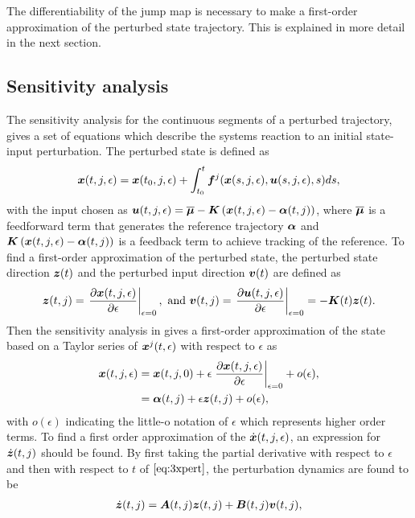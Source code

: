 \documentclass[../DC2017114Bouma.tex]{subfiles}
\begin{document}
The differentiability of the jump map is necessary to make a first-order approximation of the perturbed state trajectory. This is explained in more detail in the next section.

\subsection{Sensitivity analysis}
The sensitivity analysis for the continuous segments of a perturbed trajectory, gives a set of equations which describe the systems reaction to an initial state-input perturbation. The perturbed state is defined as
\begin{align}
{\boldsymbol{x}}(t,j,\epsilon) = {\boldsymbol{x}}(t_0,j,\epsilon) + \int_{t_0}^{t}{\boldsymbol{f}}^j({\boldsymbol{x}}(s,j,\epsilon),{\boldsymbol{u}}(s,j,\epsilon),s)ds,\label{eq:3xpert}
\end{align}
with the input chosen as ${\boldsymbol{u}}(t,j,\epsilon) = \overline{\boldsymbol{\mu}} - {\boldsymbol{K}}\left({\boldsymbol{x}}(t,j,\epsilon)-\boldsymbol{\alpha}(t,j)\right)$, where $\overline{\boldsymbol{\mu}}$ is a feedforward term that generates the reference trajectory $\boldsymbol{\alpha}$ and ${\boldsymbol{K}}\left({\boldsymbol{x}}(t,j,\epsilon)-\boldsymbol{\alpha}(t,j)\right)$ is a feedback term to achieve tracking of the reference. To find a first-order approximation of the perturbed state, the perturbed state direction ${\boldsymbol{z}}(t)$ and the perturbed input direction ${\boldsymbol{v}}(t)$ are defined as
\begin{align}
{\boldsymbol{z}}(t,j) = \left.\frac{\partial{\boldsymbol{x}}(t,j,\epsilon)}{\partial\epsilon}\right|_{\epsilon=0},\text{ and } {\boldsymbol{v}}(t,j) = \left.\frac{\partial{\boldsymbol{u}}(t,j,\epsilon)}{\partial\epsilon}\right|_{\epsilon=0}=-{\boldsymbol{K}}(t){\boldsymbol{z}}(t).
\end{align}
Then the sensitivity analysis in \cite{Khalil1996} gives a first-order approximation of the state based on a Taylor series of ${\boldsymbol{x}}^j(t,\epsilon)$ with respect to $\epsilon$ as
\begin{align}
{\boldsymbol{x}}(t,j,\epsilon) &= {\boldsymbol{x}}(t,j,0) + \epsilon\left.\frac{\partial{\boldsymbol{x}}(t,j,\epsilon)}{\partial\epsilon}\right|_{\epsilon=0} + o(\epsilon),\label{eq:3taylor}\\
&= \boldsymbol{\alpha}(t,j) + \epsilon{\boldsymbol{z}}(t,j) + o(\epsilon),
\end{align}
with $o(\epsilon)$ indicating the little-o notation of $\epsilon$ which represents higher order terms. To find a first order approximation of the $\dot{{\boldsymbol{x}}}(t,j,\epsilon)$, an expression for $\dot{{\boldsymbol{z}}}(t,j)$ should be found. By first taking the partial derivative with respect to $\epsilon$ and then with respect to $t$ of $\eqref{eq:3xpert}$, the perturbation dynamics are found to be
\begin{align}
\dot{{\boldsymbol{z}}}(t,j) = {\boldsymbol{A}}(t,j){\boldsymbol{z}}(t,j) +{\boldsymbol{B}}(t,j){\boldsymbol{v}}(t,j),
\end{align}
\end{document}
